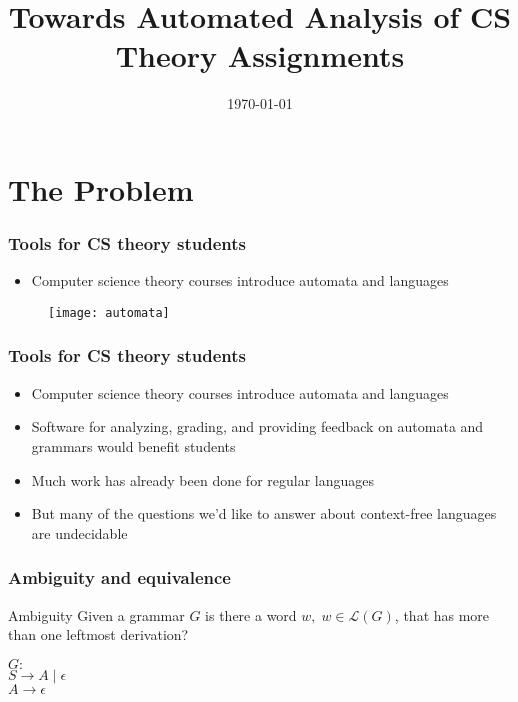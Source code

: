 \documentclass{beamer}
\title[Analysis of CS Theory Assignments]{Towards Automated Analysis of CS Theory Assignments}
\institute[RIT]{Rochester Institute of Technologoy}
\date{\today}
\begin{document}
\maketitle

\section{The Problem}

\begin{frame}
\frametitle{Tools for CS theory students}

\begin{itemize}
\item Computer science theory courses introduce automata and languages
\vspace{0.1in}
\end{itemize}

\begin{figure}
	\centering \texttt{[image: automata]}
\end{figure}

\end{frame}

\begin{frame}
\frametitle{Tools for CS theory students}

\begin{itemize}
\item Computer science theory courses introduce automata and languages
\vspace{0.1in}
\item Software for analyzing, grading, and providing feedback on automata and grammars would benefit students
\vspace{0.1in}
\item Much work has already been done for regular languages   
\vspace{0.1in}
\item But many of the questions we'd like to answer about context-free languages are undecidable
\end{itemize}
\end{frame}

\begin{frame}
\frametitle{Ambiguity and equivalence}
\begin{block}{Ambiguity}
Given a grammar $G$ is there a word $w , \; w \in \mathcal{L}(G)$, that has more than one leftmost derivation?
\end{block}

\pause 
\vspace{0.2in}
$G:$\\
\hspace*{10pt} $S \rightarrow  A \; | \; \epsilon$\\
\hspace*{10pt} $A \rightarrow   \epsilon$
\end{frame}
\end{document}
